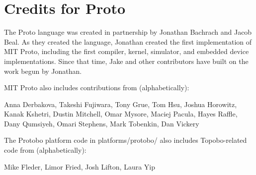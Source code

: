 
\section{Credits for Proto}

The Proto language was created in partnership by Jonathan Bachrach and
Jacob Beal.  As they created the language, Jonathan created the first
implementation of MIT Proto, including the first compiler, kernel,
simulator, and embedded device implementations.  Since that time, Jake
and other contributors have built on the work begun by Jonathan.

MIT Proto also includes contributions from (alphabetically):

  Anna Derbakova, Takeshi Fujiwara, Tony Grue, Tom Hsu, Joshua
  Horowitz, Kanak Kshetri, Dustin Mitchell, Omar Mysore, Maciej
  Pacula, Hayes Raffle, Dany Qumsiyeh, Omari Stephens,
  Mark Tobenkin, Dan Vickery

The Protobo platform code in platforms/protobo/ also includes 
Topobo-related code from (alphabetically):

  Mike Fleder, Limor Fried, Josh Lifton, Laura Yip
